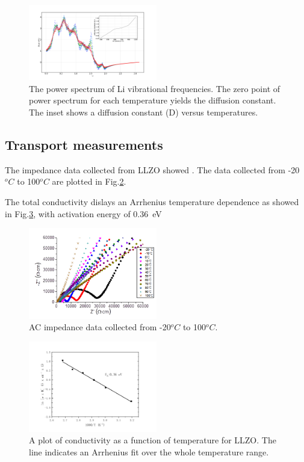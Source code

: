 \documentclass[twoside,twocolumn,9pt]{article}
\begin{document}
\begin{figure}
\centering
\includegraphics[width=0.5\textwidth]{Pics/powerSpectra.pdf}
\caption{The power spectrum of Li vibrational frequencies.
 The zero point of power spectrum for each temperature yields the diffusion constant.
 The inset shows a diffusion constant (D) versus temperatures.}
\label{fig:powerSpectra}
\end{figure}

\subsection{Transport measurements}
The impedance data collected from LLZO showed .
The data collected from -20$^oC$ to 100$^oC$ are plotted in Fig.\ref{fig:impedance}.

The total conductivity dislays an Arrhenius temperature dependence as showed in Fig.\ref{fig:arrhenius-plot},
with activation energy of 0.36~eV

\begin{figure}
\centering
\includegraphics[width=0.5\textwidth]{Pics/impedance.png}
\caption{AC impedance data collected from -20$^oC$ to 100$^oC$.}
\label{fig:impedance}
\end{figure}

\begin{figure}
\centering
\includegraphics[width=0.5\textwidth]{Pics/arrhenius-plot.png}
\caption{A plot of conductivity as a function of temperature for LLZO. The line indicates an Arrhenius fit over the whole temperature range.}
\label{fig:arrhenius-plot}
\end{figure}
\end{document}

